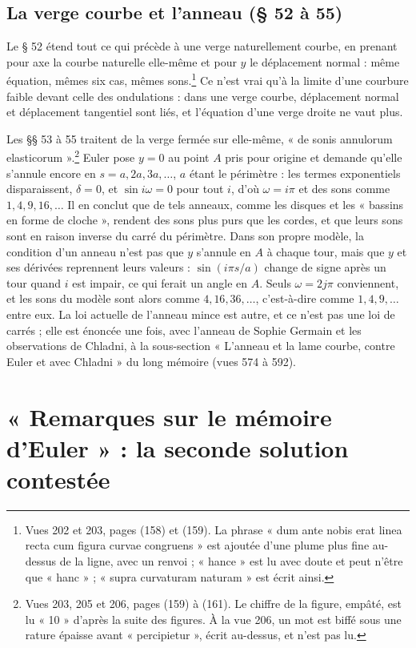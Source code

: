 \documentclass[11pt,a4paper]{article}
\begin{document}
\subsection*{La verge courbe et l'anneau (§ 52 à 55)}

Le § 52 étend tout ce qui précède à une verge naturellement courbe, en prenant pour axe la courbe naturelle elle-même et pour $y$ le déplacement normal : même équation, mêmes six cas, mêmes sons.\footnote{Vues 202 et 203, pages (158) et (159). La phrase « dum ante nobis erat linea recta cum figura curvae congruens » est ajoutée d'une plume plus fine au-dessus de la ligne, avec un renvoi ; « hance » est lu avec doute et peut n'être que « hanc » ; « supra curvaturam naturam » est écrit ainsi.} Ce n'est vrai qu'à la limite d'une courbure faible devant celle des ondulations : dans une verge courbe, déplacement normal et déplacement tangentiel sont liés, et l'équation d'une verge droite ne vaut plus.

Les §§ 53 à 55 traitent de la verge fermée sur elle-même, « de sonis annulorum elasticorum ».\footnote{Vues 203, 205 et 206, pages (159) à (161). Le chiffre de la figure, empâté, est lu « 10 » d'après la suite des figures. À la vue 206, un mot est biffé sous une rature épaisse avant « percipietur », écrit au-dessus, et n'est pas lu.} Euler pose $y=0$ au point $A$ pris pour origine et demande qu'elle s'annule encore en $s=a,2a,3a,\dots$, $a$ étant le périmètre : les termes exponentiels disparaissent, $\delta=0$, et $\sin i\omega=0$ pour tout $i$, d'où $\omega=i\pi$ et des sons comme $1,4,9,16,\dots$ Il en conclut que de tels anneaux, comme les disques et les « bassins en forme de cloche », rendent des sons plus purs que les cordes, et que leurs sons sont en raison inverse du carré du périmètre. Dans son propre modèle, la condition d'un anneau n'est pas que $y$ s'annule en $A$ à chaque tour, mais que $y$ et ses dérivées reprennent leurs valeurs : $\sin(i\pi s/a)$ change de signe après un tour quand $i$ est impair, ce qui ferait un angle en $A$. Seuls $\omega=2j\pi$ conviennent, et les sons du modèle sont alors comme $4,16,36,\dots$, c'est-à-dire comme $1,4,9,\dots$ entre eux. La loi actuelle de l'anneau mince est autre, et ce n'est pas une loi de carrés ; elle est énoncée une fois, avec l'anneau de Sophie Germain et les observations de Chladni, à la sous-section « L'anneau et la lame courbe, contre Euler et avec Chladni » du long mémoire (vues 574 à 592).

\section*{« Remarques sur le mémoire d'Euler » : la seconde solution contestée}
\end{document}
